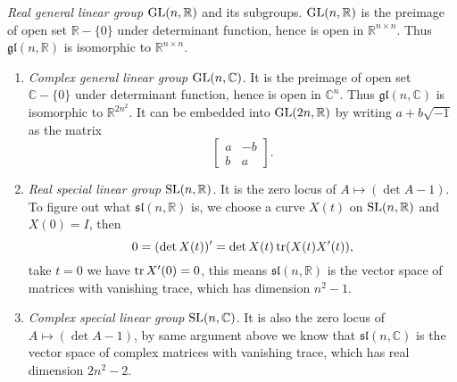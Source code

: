 \begin{eg}\label{linear group 1}
    \emph{Real general linear group} $\mathrm{GL}(n,\mathbb{R})$ and its subgroups.
    $\mathrm{GL}(n,\mathbb{R})$ is the preimage of open set $\mathbb{R}-\{0\}$ under determinant function, hence is open in $\mathbb{R}^{n\times n}$.
    Thus $\mathfrak{gl}(n,\mathbb{R})$ is isomorphic to $\mathbb{R}^{n\times n}$.
    \begin{enumerate}[(1)]
        \item \emph{Complex general linear group} $\mathrm{GL}(n,\mathbb{C})$.
        It is the preimage of open set $\mathbb{C}-\{0\}$ under determinant function, hence is open in $\mathbb{C}^n$.
        Thus $\mathfrak{gl}(n,\mathbb{C})$ is isomorphic to $\mathbb{R}^{2n^2}$.
        It can be embedded into $\mathrm{GL}(2n,\mathbb{R})$ by writing $a+b\sqrt{-1}$ as the matrix
        \[\begin{bmatrix}
            a & -b \\ b & a
        \end{bmatrix}.\]
        \item \emph{Real special linear group} $\mathrm{SL}(n,\mathbb{R})$.
        It is the zero locus of $A\mapsto(\det{A}-1)$.
        To figure out what $\mathfrak{sl}(n,\mathbb{R})$ is, we choose a curve $X(t)$ on $\mathrm{SL}(n,\mathbb{R})$ and $X(0)=I$, then
        \[0=(\det{X(t)})'=\det{X(t)}\operatorname{tr}(X(t)X'(t)),\]
        take $t=0$ we have $\operatorname{tr}{X'(0)}=0$, this means $\mathfrak{sl}(n,\mathbb{R})$ is the vector space of matrices with vanishing trace, which has dimension $n^2-1$.
        \item \emph{Complex special linear group} $\mathrm{SL}(n,\mathbb{C})$.
        It is also the zero locus of $A\mapsto(\det{A}-1)$, by same argument above we know that $\mathfrak{sl}(n,\mathbb{C})$ is the vector space of complex matrices with vanishing trace, which has real dimension $2n^2-2$.
    \end{enumerate}
\end{eg}

